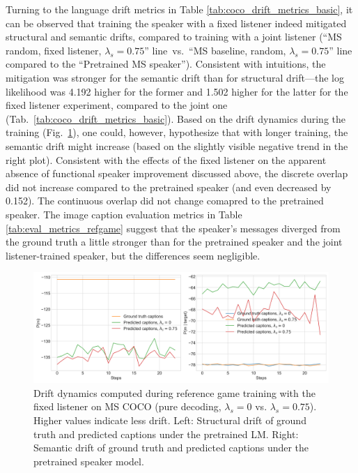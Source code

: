 Turning to the language drift metrics in Table \ref{tab:coco_drift_metrics_basic}, it can be observed that training the speaker with a fixed listener indeed mitigated structural and semantic drifts, compared to training with a joint listener (``MS random, fixed listener, $\lambda_s=0.75$'' line~vs.~``MS baseline, random, $\lambda_s=0.75$'' line compared to the ``Pretrained MS speaker''). Consistent with intuitions, the mitigation was stronger for the semantic drift than for structural drift---the log likelihood was 4.192 higher for the former and 1.502 higher for the latter for the fixed listener experiment, compared to the joint one (Tab.~\ref{tab:coco_drift_metrics_basic}). Based on the drift dynamics during the training (Fig.~\ref{fig:coco_fixed_listener_075_str_sem_drift}), one could, however, hypothesize that with longer training, the semantic drift might increase (based on the slightly visible negative trend in the right plot). Consistent with the effects of the fixed listener on the apparent absence of functional speaker improvement discussed above, the discrete overlap did not increase compared to the pretrained speaker (and even decreased by 0.152). The continuous overlap did not change comapred to the pretrained speaker. The image caption evaluation metrics in Table \ref{tab:eval_metrics_refgame} suggest that the speaker's messages diverged from the ground truth a little stronger than for the pretrained speaker and the joint listener-trained speaker, but the differences seem negligible.
\begin{figure}
	\centering
	\includegraphics[width=\linewidth]{images/coco_fixedListener_structural_semantic_drift_4000_pure_0_075_random.png}
	\caption{Drift dynamics computed during reference game training with the fixed listener on MS COCO (pure decoding, $\lambda_s=0$ vs. $\lambda_s=0.75$). Higher values indicate less drift. Left: Structural drift of ground truth and predicted captions under the pretrained LM. Right: Semantic drift of ground truth and predicted captions under the pretrained speaker model.}
	\label{fig:coco_fixed_listener_075_str_sem_drift}
\end{figure}

